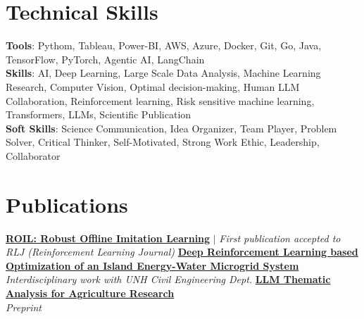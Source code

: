 \documentclass[letterpaper,11pt]{article}
\begin{document}
\section{Technical Skills}
    \begin{itemize}[leftmargin=0.15in, label={}]
    \small{
      \item{
      \textbf{Tools}{: Pythom, Tableau, Power-BI, AWS, Azure, Docker, Git, Go, Java, TensorFlow, PyTorch, Agentic AI, LangChain} \\[0.5em]
      \textbf{Skills}{: AI, Deep Learning, Large Scale Data Analysis, Machine Learning Research, Computer Vision, Optimal decision-making, Human LLM Collaboration, Reinforcement learning, Risk sensitive machine learning, Transformers, LLMs, Scientific Publication} \\ [0.5em]
      \textbf{Soft Skills}{: Science Communication, Idea Organizer, Team Player, Problem Solver, Critical Thinker, Self-Motivated, Strong Work Ethic, Leadership, Collaborator} \\ [0.5em]
      }
    }
  \end{itemize}
\section{Publications}
\resumeSubHeadingListStart

    \resumeProjectHeading
    {\href{https://gersid.github.io/publications/}{\textbf{ROIL: Robust Offline Imitation Learning}} $|$ \emph{First publication accepted to RLJ (Reinforcement
    Learning Journal)}}    {}
    \resumeItemListStart
    \resumeItemListEnd
    \resumeProjectHeading
    {\href{https://gersid.github.io/publications/}{\textbf{Deep Reinforcement Learning based Optimization of an Island
        Energy-Water Microgrid System}} \\ \emph{Interdisciplinary work with UNH Civil Engineering Dept.}}{}
    \resumeItemListStart
    \resumeItemListEnd
    \resumeProjectHeading
    {\href{https://gersid.github.io/publications/}{\textbf{LLM Thematic Analysis for Agriculture Research}} \\ \emph{Preprint}}{}
    \resumeItemListStart
    \resumeItemListEnd
\resumeSubHeadingListEnd
\end{document}
